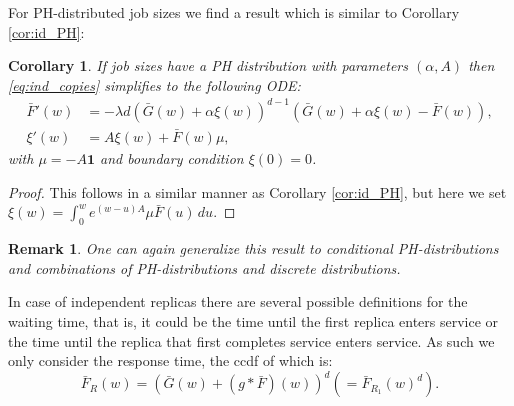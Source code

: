 \documentclass[12pt]{report}
\newtheorem{remark}{Remark}
\newtheorem{corollary}[theorem]{Corollary}
\begin{document}
For PH-distributed job sizes we find a result which is similar to Corollary \ref{cor:id_PH}:
\begin{corollary}\label{cor:ind_PH}
If job sizes have a PH distribution with parameters $(\alpha, A)$ then \eqref{eq:ind_copies} simplifies to the following ODE:
\begin{align*}
\bar F'(w)
&=
-\lambda d (\bar G(w) + \alpha \xi(w))^{d-1} \left( \bar G(w) + \alpha \xi(w) - \bar F(w) \right),\\
\xi'(w)
&=
A\xi(w) + \bar F(w) \mu,
\end{align*}
with $\mu = -A\textbf{1}$ and boundary condition $\xi(0)=0$.
\end{corollary}
\begin{proof}
This follows in a similar manner as Corollary \ref{cor:id_PH}, but here we set $\xi(w)= \int_0^w e^{(w-u) A} \mu \bar F(u)\, du$.
\end{proof}
\begin{remark}
One can again generalize this result to conditional PH-distributions and combinations of PH-distributions and discrete distributions.
\end{remark}
In case of independent replicas there are several possible definitions for the waiting time, that is,
it could be the time until the first replica enters service or the time until the replica that
first completes service enters service. As such we only consider the response time, the ccdf of which 
is:
$$
\bar F_R(w)=\left(\bar G(w)+(g*\bar F)(w)\right)^d \left(=\bar{F}_{R_1}(w)^d\right).
$$
\end{document}
